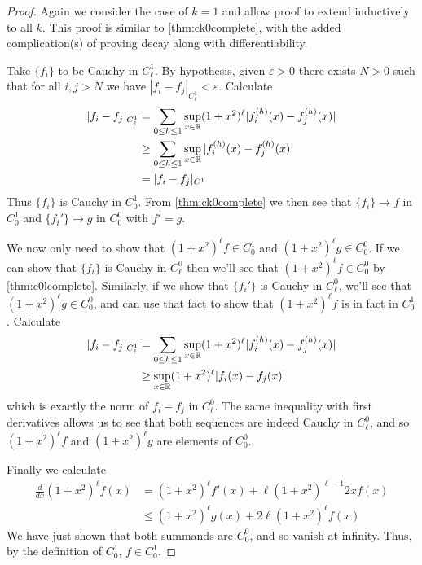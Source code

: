       \begin{proof}
        Again we consider the case of $k=1$ and allow proof to extend inductively to all $k$.
        This proof is similar to \cref{thm:ck0complete}, with the added complication(s) of proving decay along with differentiability.

        Take $\{f_i\}$ to be Cauchy in $C^1_\ell$.
        By hypothesis, given $\varepsilon>0$ there exists $N>0$ such that for all $i,j>N$ we have $|f_i -f_j|_{C^1_\ell} < \varepsilon$.
        Calculate
        \begin{align*}
          |f_i -f_j|_{C^1_\ell}
          &= \sum_{0\le h\le 1}\sup_{x\in\mathbb{R}}(1+x^2)^\ell|f_i^{(h)}(x)-f_j^{(h)}(x)|\\
          &\ge \sum_{0\le h\le 1}\sup_{x\in\mathbb{R}}|f_i^{(h)}(x)-f_j^{(h)}(x)|\\
          &= |f_i-f_j|_{C^1}
        \end{align*}
        Thus $\{f_i\}$ is Cauchy in $C^1_0$.
        From \cref{thm:ck0complete} we then see that $\{f_i\}\rightarrow f$ in $C^1_0$ and $\{f_i'\}\rightarrow g$ in $C^0_0$ with $f'=g$.

        We now only need to show that $(1+x^2)^\ell f\in C^1_0$ and $(1+x^2)^\ell g\in C^0_0$.
        If we can show that $\{f_i\}$ is Cauchy in $C^0_\ell$ then we'll see that $(1+x^2)^\ell f\in C^0_0$ by \cref{thm:c0lcomplete}.
        Similarly, if we show that $\{f_i'\}$ is Cauchy in $C^0_\ell$, we'll see that $(1+x^2)^\ell g\in C^0_0$, and can use that fact to show that $(1+x^2)^\ell f$ is in fact in $C^1_0$.
        Calculate
        \begin{align*}
          |f_i -f_j|_{C^1_\ell}
          &= \sum_{0\le h\le 1}\sup_{x\in\mathbb{R}}(1+x^2)^\ell|f_i^{(h)}(x)-f_j^{(h)}(x)|\\
          &\ge \sup_{x\in\mathbb{R}}(1+x^2)^\ell|f_i(x)-f_j(x)|
        \end{align*}
        which is exactly the norm of $f_i-f_j$ in $C^0_\ell$.
        The same inequality with first derivatives allows us to see that both sequences are indeed Cauchy in $C^0_\ell$, and so $(1+x^2)^\ell f$ and $(1+x^2)^\ell g$ are elements of $C^0_0$.

        Finally we calculate
        \begin{align*}
          \frac{d}{dx}(1+x^2)^\ell f(x)
          &= (1+x^2)^\ell f'(x) + \ell(1+x^2)^{\ell-1}2xf(x)\\
          &\le (1+x^2)^\ell g(x) + 2\ell(1+x^2)^\ell f(x)
        \end{align*}
        We have just shown that both summands are $C^0_0$, and so vanish at infinity.
        Thus, by the definition of $C^1_0$, $f\in C^1_0$.


\end{proof}
